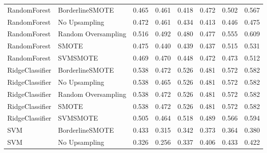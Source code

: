 \begin{tabular}{llllllll}
                RandomForest &     BorderlineSMOTE & 0.465 &                     0.461 &                 0.418 &                  0.472 &                                   0.502 &     0.567 \\
                RandomForest &       No Upsampling & 0.472 &                     0.461 &                 0.434 &                  0.413 &                                   0.446 &     0.475 \\
                RandomForest & Random Oversampling & 0.516 &                     0.492 &                 0.480 &                  0.477 &                                   0.555 &     0.609 \\
                RandomForest &               SMOTE & 0.475 &                     0.440 &                 0.439 &                  0.437 &                                   0.515 &     0.531 \\
                RandomForest &            SVMSMOTE & 0.469 &                     0.470 &                 0.448 &                  0.472 &                                   0.473 &     0.512 \\
             RidgeClassifier &     BorderlineSMOTE & 0.538 &                     0.472 &                 0.526 &                  0.481 &                                   0.572 &     0.582 \\
             RidgeClassifier &       No Upsampling & 0.538 &                     0.465 &                 0.526 &                  0.481 &                                   0.572 &     0.582 \\
             RidgeClassifier & Random Oversampling & 0.538 &                     0.472 &                 0.526 &                  0.481 &                                   0.572 &     0.582 \\
             RidgeClassifier &               SMOTE & 0.538 &                     0.472 &                 0.526 &                  0.481 &                                   0.572 &     0.582 \\
             RidgeClassifier &            SVMSMOTE & 0.505 &                     0.464 &                 0.518 &                  0.489 &                                   0.566 &     0.594 \\
                         SVM &     BorderlineSMOTE & 0.433 &                     0.315 &                 0.342 &                  0.373 &                                   0.364 &     0.380 \\
                         SVM &       No Upsampling & 0.326 &                     0.256 &                 0.337 &                  0.406 &                                   0.433 &     0.422 \\

\end{tabular}
